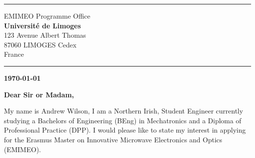 \documentclass[12pt,a4paper,ragged2e,withhyper]{altacv}
\begin{document}

  
\begin{adjustwidth}{7cm}{}
\makecvheader

{\color{headingrule}\rule{\linewidth}{2pt}\par}
\end{adjustwidth}

\medskip
\begin{paracol}{2}
{\taglinefont\color{tagline}EMIMEO Programme Office} \\
\textbf{\color{accent}Université de Limoges} \\
123 Avenue Albert Thomas \\
87060 LIMOGES Cedex \\
France \\

{\color{headingrule}\rule{6cm}{2pt}\par}

\switchcolumn

\begin{flushright}
	\textbf{\today}
\end{flushright}

\end{paracol}

\vspace{5mm}





\textbf{Dear Sir or Madam,} \\

\vspace{1cm}



My name is Andrew Wilson, I am a Northern Irish, Student Engineer currently studying a Bachelors of Engineering (BEng) in Mechatronics and a Diploma of Professional Practice (DPP).
I would please like to state my interest in applying for the Erasmus Master on Innovative Microwave Electronics and Optics (EMIMEO).\linebreak
\end{document}

